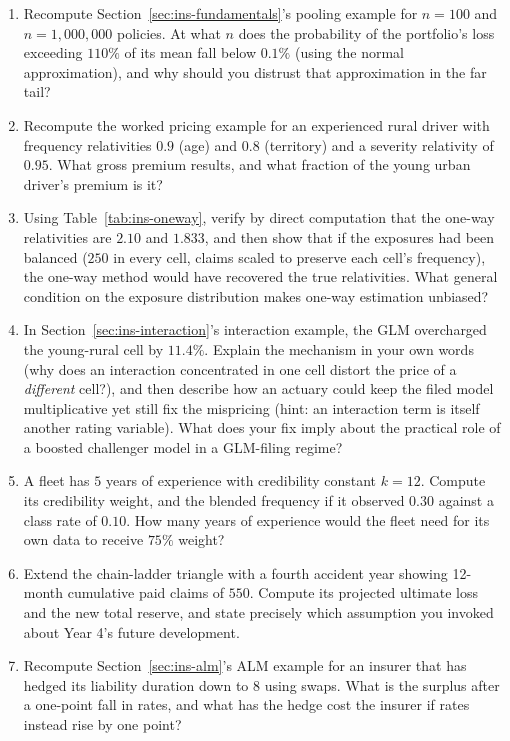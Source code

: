 \documentclass[../ai_in_finance]{subfiles}
\begin{document}
\begin{enumerate}[exercises]
\item Recompute Section~\ref{sec:ins-fundamentals}'s pooling example for $n = 100$ and $n = 1{,}000{,}000$ policies. At what $n$ does the probability of the portfolio's loss exceeding $110\%$ of its mean fall below $0.1\%$ (using the normal approximation), and why should you distrust that approximation in the far tail?
\item Recompute the worked pricing example for an experienced rural driver with frequency relativities $0.9$ (age) and $0.8$ (territory) and a severity relativity of $0.95$. What gross premium results, and what fraction of the young urban driver's premium is it?
\item Using Table~\ref{tab:ins-oneway}, verify by direct computation that the one-way relativities are $2.10$ and $1.833$, and then show that if the exposures had been balanced ($250$ in every cell, claims scaled to preserve each cell's frequency), the one-way method would have recovered the true relativities. What general condition on the exposure distribution makes one-way estimation unbiased?
\item In Section~\ref{sec:ins-interaction}'s interaction example, the GLM overcharged the young-rural cell by $11.4\%$. Explain the mechanism in your own words (why does an interaction concentrated in one cell distort the price of a \emph{different} cell?), and then describe how an actuary could keep the filed model multiplicative yet still fix the mispricing (hint: an interaction term is itself another rating variable). What does your fix imply about the practical role of a boosted challenger model in a GLM-filing regime?
\item A fleet has $5$ years of experience with credibility constant $k = 12$. Compute its credibility weight, and the blended frequency if it observed $0.30$ against a class rate of $0.10$. How many years of experience would the fleet need for its own data to receive $75\%$ weight?
\item Extend the chain-ladder triangle with a fourth accident year showing 12-month cumulative paid claims of $550$. Compute its projected ultimate loss and the new total reserve, and state precisely which assumption you invoked about Year 4's future development.
\item Recompute Section~\ref{sec:ins-alm}'s ALM example for an insurer that has hedged its liability duration down to $8$ using swaps. What is the surplus after a one-point fall in rates, and what has the hedge cost the insurer if rates instead rise by one point?

\end{enumerate}
\end{document}
